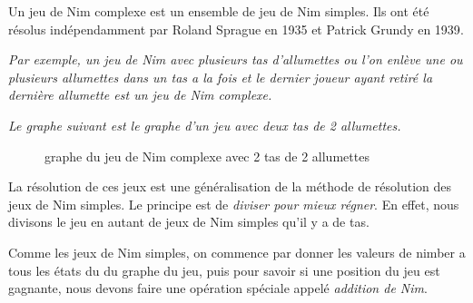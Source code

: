     Un jeu de Nim complexe est un ensemble de jeu de Nim simples. Ils ont été résolus indépendamment par Roland Sprague en 1935 et Patrick Grundy en 1939\cite{tsgE}.

    \textit{
      Par exemple, un jeu de Nim avec plusieurs tas d'allumettes ou l'on enlève une ou plusieurs allumettes dans un tas a la fois et le dernier joueur ayant retiré la dernière allumette est un jeu de Nim complexe.
    }

    \textit{
      Le graphe suivant est le graphe d'un jeu avec deux tas de 2 allumettes.
    }

     \begin{figure}[h]
        \centering
      \caption{graphe du jeu de Nim complexe avec 2 tas de 2 allumettes}
    \end{figure}

    La résolution de ces jeux est une généralisation de la méthode de résolution des jeux de Nim simples. Le principe est de \textit{diviser pour mieux régner}. En effet, nous divisons le jeu en autant de jeux de Nim simples qu'il y a de tas.

    Comme les jeux de Nim simples, on commence par donner les valeurs de nimber a tous les états du du graphe du jeu, puis pour savoir si une position du jeu est gagnante, nous devons faire une opération spéciale appelé \textit{addition de Nim}.

